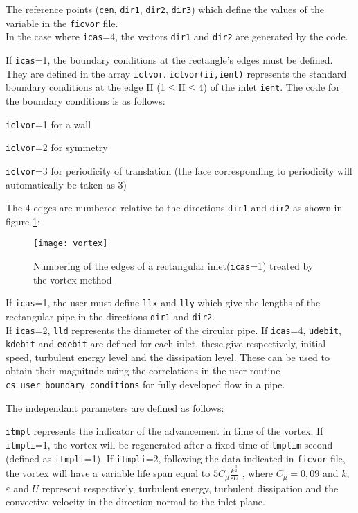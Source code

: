 {{{\begin{list}{-}{}
The reference points (\texttt{cen}, \texttt{dir1}, \texttt{dir2}, \texttt{dir3})
which define the values of the variable in the \texttt{ficvor} file.\\
In the case where \texttt{icas}=4, the vectors \texttt{dir1} and \texttt{dir2}
are generated by the code.

If \texttt{icas}=1, the boundary conditions at the rectangle's edges must be
defined. They are defined in the array
\texttt{iclvor}. \texttt{iclvor(ii,ient)} represents the standard boundary
conditions at the edge II (1$\leqslant$II$\leqslant$4) of the inlet
\texttt{ient}. The code for the boundary conditions is as follows:
\begin{list}{*}{}
\item \texttt{iclvor}=1 for a wall
\item \texttt{iclvor}=2 for symmetry
\item \texttt{iclvor}=3 for periodicity of translation (the face corresponding
      to periodicity will automatically be taken as 3)
\end{list}
The 4 edges are numbered relative to the directions \texttt{dir1} and
\texttt{dir2} as shown in figure \ref{Fig_vortex}:

\begin{figure}[!ht]
\centerline{
\texttt{[image: vortex]}}
\caption{Numbering of the edges of a rectangular inlet(\texttt{icas}=1)
 treated by the vortex method}\label{Fig_vortex}
\end{figure}

If \texttt{icas}=1, the user must define \texttt{llx} and \texttt{lly} which give
the lengths of the rectangular pipe in the directions \texttt{dir1} and \texttt{dir2}.\\
If \texttt{icas}=2, \texttt{lld} represents the diameter of the circular pipe.
If \texttt{icas}=4, \texttt{udebit}, \texttt{kdebit} and \texttt{edebit} are
defined for each inlet, these give respectively,
initial speed, turbulent energy level and the dissipation level. These can be used to
 obtain their magnitude using the correlations in the user routine \texttt{cs\_user\_boundary\_conditions} for
 fully developed flow in a pipe.

 The independant parameters are defined as follows:
\begin{list}{*}{}
\item \texttt{itmpl} represents the indicator of the advancement in time of the
  vortex. If \texttt{itmpli}=1, the vortex will be regenerated after a fixed
  time of
  \texttt{tmplim} second (defined as \texttt{itmpli}=1).
  If \texttt{itmpli}=2, following the data indicated in \texttt{ficvor} file,
  the vortex will have a variable life span equal to
  $5 \displaystyle C_\mu \displaystyle \frac{k^{\frac{3}{2}}}{\varepsilon U}$ ,
  where $C_\mu=0,09$ and $k$, $\varepsilon$ and $U$  represent respectively, turbulent energy,
  turbulent dissipation and the convective velocity in the direction normal to the inlet plane.


\end{list}
\end{list}}}}
